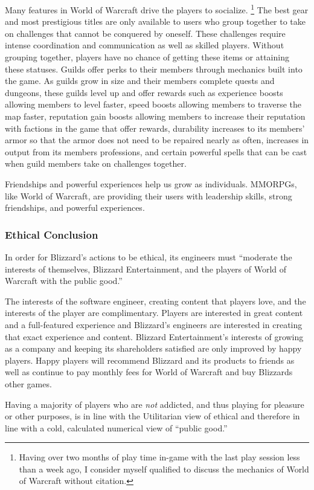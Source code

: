 \documentclass[11pt]{article}
\begin{document}
\begin{multicols}{2}
Many features in World of Warcraft drive the players to socialize. \footnote{Having over two months of play time in-game with the last play session less than a week ago, I consider myself qualified to discuss the mechanics of World of Warcraft without citation.} The best gear and most prestigious titles are only available to users who group together to take on challenges that cannot be conquered by oneself. These challenges require intense coordination and communication as well as skilled players. Without grouping together, players have no chance of getting these items or attaining these statuses.
Guilds offer perks to their members through mechanics built into the game. As guilds grow in size and their members complete quests and dungeons, these guilds level up and offer rewards such as experience boosts allowing members to level faster, speed boosts allowing members to traverse the map faster, reputation gain boosts allowing members to increase their reputation with factions in the game that offer rewards, durability increases to its members' armor so that the armor does not need to be repaired nearly as often, increases in output from its members professions, and certain powerful spells that can be cast when guild members take on challenges together.

Friendships and powerful experiences help us grow as individuals. MMORPGs, like World of Warcraft, are providing their users with leadership skills, strong friendships, and powerful experiences.

\subsubsection{Ethical Conclusion}
In order for Blizzard's actions to be ethical, its engineers must ``moderate the interests of themselves, Blizzard Entertainment, and the players of World of Warcraft with the public good.''

The interests of the software engineer, creating content that players love, and the interests of the player are complimentary. Players are interested in great content and a full-featured experience and Blizzard's engineers are interested in creating that exact experience and content.
Blizzard Entertainment's interests of growing as a company and keeping its shareholders satisfied are only improved by happy players. Happy players will recommend Blizzard and its products to friends as well as continue to pay monthly fees for World of Warcraft and buy Blizzards other games.

Having a majority of players who are \emph{not} addicted, and thus playing for pleasure or other purposes, is in line with the Utilitarian view of ethical and therefore in line with a cold, calculated numerical view of ``public good.''


\end{multicols}
\end{document}

